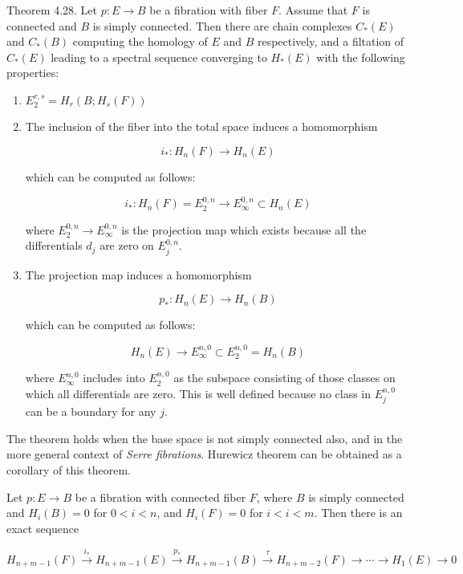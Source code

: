 \begin{theo}
    Theorem 4.28. Let $p: E \rightarrow B$ be a fibration with fiber $F$. Assume that $F$ is connected and $B$ is simply connected. Then there are chain complexes $C_*(E)$ and $C_*(B)$ computing the homology of $E$ and $B$ respectively, and a filtation of $C_*(E)$ leading to a spectral sequence converging to $H_*(E)$ with the following properties:
    \begin{enumerate}

\item $E_2^{r, s}=H_r\left(B ; H_s(F)\right)$
\item The inclusion of the fiber into the total space induces a homomorphism

$$
i_*: H_n(F) \rightarrow H_n(E)
$$

which can be computed as follows:

$$
i_*: H_n(F)=E_2^{0, n} \rightarrow E_{\infty}^{0, n} \subset H_n(E)
$$

where $E_2^{0, n} \rightarrow E_{\infty}^{0, n}$ is the projection map which exists because all the differentials $d_j$ are zero on $E_j^{0, n}$.

\item The projection map induces a homomorphism

$$
p_*: H_n(E) \rightarrow H_n(B)
$$

which can be computed as follows:

$$
H_n(E) \rightarrow E_{\infty}^{n, 0} \subset E_2^{n, 0}=H_n(B)
$$

where $E_{\infty}^{n, 0}$ includes into $E_2^{n, 0}$ as the subspace consisting of those classes on which all differentials are zero. This is well defined because no class in $E_j^{n, 0}$ can be a boundary for any $j$.
    \end{enumerate}
\end{theo}

The theorem holds when the base space is not simply connected also, and in the more general context of \textit{Serre fibrations}. Hurewicz theorem can be obtained as a corollary of this theorem.

\begin{theo}
Let $p: E \rightarrow B$ be a fibration with connected fiber $F$, where $B$ is simply connected and $H_i(B)=0$ for $0<i<n$, and $H_i(F)=0$ for $i<i<m$. Then there is an exact sequence

    $$
    H_{n+m-1}(F) \xrightarrow{i_*} H_{n+m-1}(E) \xrightarrow{p_*} H_{n+m-1}(B) \xrightarrow{\tau} H_{n+m-2}(F) \rightarrow \cdots \rightarrow H_1(E) \rightarrow 0
    $$
        
\end{theo}

